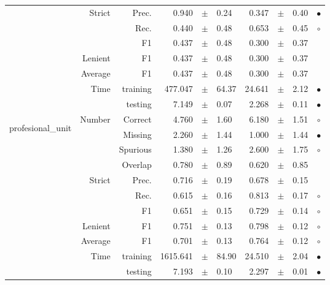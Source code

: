 \begin{longtable}{|r|r|r||rcl|rcl|c|}
\cline{2-10}
  & \multirow{3}{*}{Strict} &  Prec.  & 0.940 &  $\pm$  & 0.24 & 0.347 &  $\pm$  & 0.40 &  $\bullet$\\
\cline{3-10}
  &  &  Rec.  & 0.440 &  $\pm$  & 0.48 & 0.653 &  $\pm$  & 0.45 &  $\circ$\\
\cline{3-10}
  &  &  F1  & 0.437 &  $\pm$  & 0.48 & 0.300 &  $\pm$  & 0.37 &   \\
\cline{2-10}
  & Lenient &  F1  & 0.437 &  $\pm$  & 0.48 & 0.300 &  $\pm$  & 0.37 &   \\
\cline{2-10}
  & Average &  F1  & 0.437 &  $\pm$  & 0.48 & 0.300 &  $\pm$  & 0.37 &   \\
\cline{2-10}
  & \multirow{2}{*}{Time} &  training  & 477.047 &  $\pm$  & 64.37 & 24.641 &  $\pm$  & 2.12 &  $\bullet$\\
\cline{3-10}
  &  &  testing  & 7.149 &  $\pm$  & 0.07 & 2.268 &  $\pm$  & 0.11 &  $\bullet$\\
\hline
\hline
\multirow{11}{*}{\begin{sideways}profesional\_unit\end{sideways} } & \multirow{4}{*}{Number} &  Correct  & 4.760 &  $\pm$  & 1.60 & 6.180 &  $\pm$  & 1.51 &  $\circ$\\
\cline{3-10}
  &  &  Missing  & 2.260 &  $\pm$  & 1.44 & 1.000 &  $\pm$  & 1.44 &  $\bullet$\\
\cline{3-10}
  &  &  Spurious  & 1.380 &  $\pm$  & 1.26 & 2.600 &  $\pm$  & 1.75 &  $\circ$\\
\cline{3-10}
  &  &  Overlap  & 0.780 &  $\pm$  & 0.89 & 0.620 &  $\pm$  & 0.85 &   \\
\cline{2-10}
  & \multirow{3}{*}{Strict} &  Prec.  & 0.716 &  $\pm$  & 0.19 & 0.678 &  $\pm$  & 0.15 &   \\
\cline{3-10}
  &  &  Rec.  & 0.615 &  $\pm$  & 0.16 & 0.813 &  $\pm$  & 0.17 &  $\circ$\\
\cline{3-10}
  &  &  F1  & 0.651 &  $\pm$  & 0.15 & 0.729 &  $\pm$  & 0.14 &  $\circ$\\
\cline{2-10}
  & Lenient &  F1  & 0.751 &  $\pm$  & 0.13 & 0.798 &  $\pm$  & 0.12 &  $\circ$\\
\cline{2-10}
  & Average &  F1  & 0.701 &  $\pm$  & 0.13 & 0.764 &  $\pm$  & 0.12 &  $\circ$\\
\cline{2-10}
  & \multirow{2}{*}{Time} &  training  & 1615.641 &  $\pm$  & 84.90 & 24.510 &  $\pm$  & 2.04 &  $\bullet$\\
\cline{3-10}
  &  &  testing  & 7.193 &  $\pm$  & 0.10 & 2.297 &  $\pm$  & 0.01 &  $\bullet$\\

\end{longtable}
